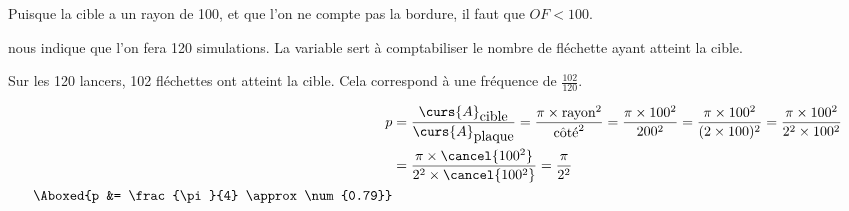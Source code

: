 \documentclass["../Cours.tex"]{subfiles}
\begin{document}
\begin{questions}
    \question Puisque la cible a un rayon de 100, et que l'on ne compte pas la bordure, il faut que $OF < 100$.
    \question 
        \subquestion \begin{scratch}\end{scratch} nous indique que l'on fera 120 simulations.
        \subquestion La variable  sert à comptabiliser le nombre de fléchette ayant atteint la cible.
        \subquestion 
        \begin{scratch}
        		{
                }
         \end{scratch}
        \subquestion Sur les 120 lancers, 102 fléchettes ont atteint la cible. Cela correspond à une fréquence de $\frac{102}{120}$.

    \question 
    \begin{align*}
    p &= \frac{\curs{A}_{\mbox{cible}}}{\curs{A}_{\mbox{plaque}}}
    = \frac{\pi \times \mbox{rayon}^2}{\mbox{côté}^2}
    = \frac{\pi \times 100^2}{200^2} 
    = \frac{\pi \times 100^2}{(2 \times 100)^2} 
    = \frac{\pi \times 100^2}{2^2 \times 100^2} \\ 
    &= \frac{\pi \times \cancel{100^2}}{2^2 \times \cancel{100^2}}
    = \frac{\pi}{2^2} \\ 
    \Aboxed{p &= \frac{\pi}{4} \approx \num{0.79}}
    \end{align*}


\end{questions}
\end{document}
